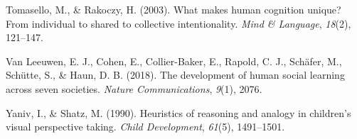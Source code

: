 \documentclass[
  man,floatsintext]{apa7}
\newlength{\cslhangindent}
\newlength{\cslentryspacingunit} %
\newenvironment{CSLReferences}[2] %
 {%
  \setlength{\parindent}{0pt}
  \ifodd #1
  \let\oldpar\par
  \def\par{\hangindent=\cslhangindent\oldpar}
  \fi
  \setlength{\parskip}{#2\cslentryspacingunit}
 }%
 {}
\begin{document}
\begin{CSLReferences}{1}{0}
\leavevmode{}%
Tomasello, M., \& Rakoczy, H. (2003). What makes human cognition unique? From individual to shared to collective intentionality. \emph{Mind \& Language}, \emph{18}(2), 121--147.

\leavevmode{}%
Van Leeuwen, E. J., Cohen, E., Collier-Baker, E., Rapold, C. J., Schäfer, M., Schütte, S., \& Haun, D. B. (2018). The development of human social learning across seven societies. \emph{Nature Communications}, \emph{9}(1), 2076.

\leavevmode{}%
Yaniv, I., \& Shatz, M. (1990). Heuristics of reasoning and analogy in children's visual perspective taking. \emph{Child Development}, \emph{61}(5), 1491--1501.

\end{CSLReferences}
\end{document}
